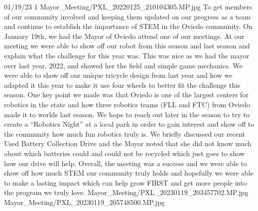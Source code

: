 {01/19/23}
{1}
{Mayor_Meeting/PXL_20220125_210104305.MP.jpg}
{To get members of our community involved and keeping them updated on our progress as a team and continue to establish the importance of STEM in the Oviedo community.}
{On January 19th, we had the Mayor of Oviedo attend one of our meetings. At our meeting we were able to show off our robot from this season and last season and explain what the challenge for this year was. This was nice as we had the mayor over last year, 2022, and showed her the field and simple game mechanics. We were able to show off our unique tricycle design from last year and how we adapted it this year to make it use four wheels to better fit the challenge this season. One key point we made was that Oviedo is one of the largest centers for robotics in the state and how three robotics teams (FLL and FTC) from Oviedo made it to worlds last season. We hope to reach out later in the season to try to create a “Robotics Night” at a local park in order to gain interest and show off to the community how much fun robotics truly is. We briefly discussed our recent Used Battery Collection Drive and the Mayor noted that she did not know much about which batteries could and could not be recycled which just goes to show how our drive will help. Overall, the meeting was a success and we were able to show off how much STEM our community truly holds and hopefully we were able to make a lasting impact which can help grow FIRST and get more people into the program we truly love.
} 
{Mayor_Meeting/PXL_20230119_203457702.MP.jpg}
{Mayor_Meeting/PXL_20230119_205748500.MP.jpg}
